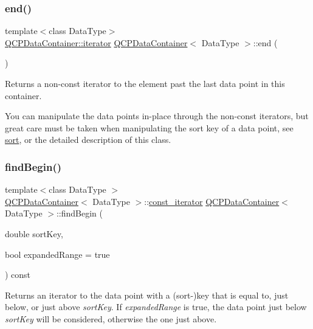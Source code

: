 \subsubsection{\texorpdfstring{end()}{end()}}
{\footnotesize\ttfamily template$<$class Data\+Type$>$ \\
\hyperlink{class_q_c_p_data_container_a1bb453c3ae37d1ee5268878acb3a9d29}{Q\+C\+P\+Data\+Container\+::iterator} \hyperlink{class_q_c_p_data_container}{Q\+C\+P\+Data\+Container}$<$ Data\+Type $>$\+::end (\begin{DoxyParamCaption}{ }\end{DoxyParamCaption})\hspace{0.3cm}{\ttfamily [inline]}}

Returns a non-\/const iterator to the element past the last data point in this container.

You can manipulate the data points in-\/place through the non-\/const iterators, but great care must be taken when manipulating the sort key of a data point, see \hyperlink{class_q_c_p_data_container_a75da92e33063b63d6da5014683591d45}{sort}, or the detailed description of this class. \mbox{\label{class_q_c_p_data_container_a2ad8a5399072d99a242d3a6d2d7e278a}} 
\subsubsection{\texorpdfstring{find\+Begin()}{findBegin()}}
{\footnotesize\ttfamily template$<$class Data\+Type $>$ \\
\hyperlink{class_q_c_p_data_container}{Q\+C\+P\+Data\+Container}$<$ Data\+Type $>$\+::\hyperlink{class_q_c_p_data_container_ae40a91f5cb0bcac61d727427449b7d15}{const\+\_\+iterator} \hyperlink{class_q_c_p_data_container}{Q\+C\+P\+Data\+Container}$<$ Data\+Type $>$\+::find\+Begin (\begin{DoxyParamCaption}\item[{double}]{sort\+Key,  }\item[{bool}]{expanded\+Range = {\ttfamily true} }\end{DoxyParamCaption}) const}

Returns an iterator to the data point with a (sort-\/)key that is equal to, just below, or just above {\itshape sort\+Key}. If {\itshape expanded\+Range} is true, the data point just below {\itshape sort\+Key} will be considered, otherwise the one just above.

